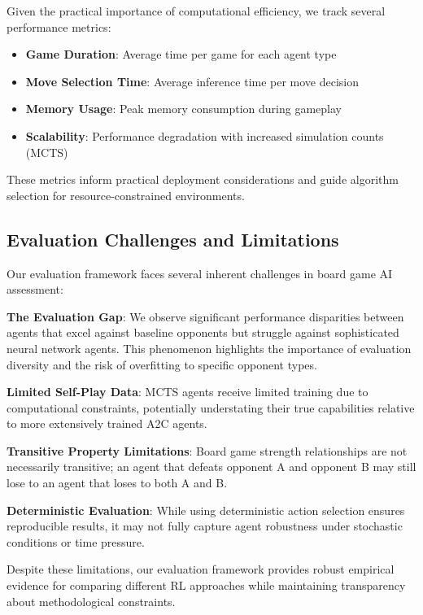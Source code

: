 \documentclass[conference]{IEEEtran}
\begin{document}
Given the practical importance of computational efficiency, we track several performance metrics:

\begin{itemize}
\item \textbf{Game Duration}: Average time per game for each agent type
\item \textbf{Move Selection Time}: Average inference time per move decision
\item \textbf{Memory Usage}: Peak memory consumption during gameplay
\item \textbf{Scalability}: Performance degradation with increased simulation counts (MCTS)
\end{itemize}

These metrics inform practical deployment considerations and guide algorithm selection for resource-constrained environments.

\subsection{Evaluation Challenges and Limitations}

Our evaluation framework faces several inherent challenges in board game AI assessment:

\textbf{The Evaluation Gap}: We observe significant performance disparities between agents that excel against baseline opponents but struggle against sophisticated neural network agents. This phenomenon highlights the importance of evaluation diversity and the risk of overfitting to specific opponent types.

\textbf{Limited Self-Play Data}: MCTS agents receive limited training due to computational constraints, potentially understating their true capabilities relative to more extensively trained A2C agents.

\textbf{Transitive Property Limitations}: Board game strength relationships are not necessarily transitive; an agent that defeats opponent A and opponent B may still lose to an agent that loses to both A and B.

\textbf{Deterministic Evaluation}: While using deterministic action selection ensures reproducible results, it may not fully capture agent robustness under stochastic conditions or time pressure.

Despite these limitations, our evaluation framework provides robust empirical evidence for comparing different RL approaches while maintaining transparency about methodological constraints.
\end{document}
